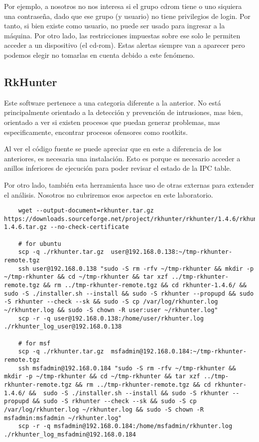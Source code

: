 \documentclass[11pt]{utalcaDoc}
\begin{document}
Por ejemplo, a nosotros no nos interesa si el grupo cdrom tiene o uno siquiera una contraseña, dado que ese grupo (y usuario) no tiene privilegios de login. Por tanto, si bien existe como usuario, no puede ser usado para ingresar a la máquina. Por otro lado, las restricciones impuestas sobre ese solo le permiten acceder a un dispositivo (el cd-rom). Estas alertas siempre van a aparecer pero podemos elegir no tomarlas en cuenta debido a este fenómeno. 


\subsection{RkHunter}

Este software pertenece a una categoria diferente a la anterior. No está principalmente orientado a la detección y prevención de intrusiones, mas bien, orientado a ver si existen procesos que puedan generar problemas, mas especificamente, encontrar procesos ofensores como rootkits.

Al ver el código fuente se puede apreciar que en este a diferencia de los anteriores, es necesaria una instalación. Esto es porque es necesario acceder a anillos inferiores de ejecución para poder revisar el estado de la IPC table.

Por otro lado, también esta herramienta hace uso de otras externas para extender el análisis. Nosotros no cubriremos esos aspectos en este laboratorio.

\begin{verbatim}
	wget --output-document=rkhunter.tar.gz https://downloads.sourceforge.net/project/rkhunter/rkhunter/1.4.6/rkhunter-1.4.6.tar.gz --no-check-certificate

	# for ubuntu
	scp -q ./rkhunter.tar.gz  user@192.168.0.138:~/tmp-rkhunter-remote.tgz 
	ssh user@192.168.0.138 "sudo -S rm -rfv ~/tmp-rkhunter && mkdir -p ~/tmp-rkhunter && cd ~/tmp-rkhunter && tar xzf ../tmp-rkhunter-remote.tgz && rm ../tmp-rkhunter-remote.tgz && cd rkhunter-1.4.6/ &&  sudo -S ./installer.sh --install && sudo -S rkhunter --propupd && sudo -S rkhunter --check --sk && sudo -S cp /var/log/rkhunter.log ~/rkhunter.log && sudo -S chown -R user:user ~/rkhunter.log"
	scp -r -q user@192.168.0.138:/home/user/rkhunter.log ./rkhunter_log_user@192.168.0.138

	# for msf
	scp -q ./rkhunter.tar.gz  msfadmin@192.168.0.184:~/tmp-rkhunter-remote.tgz 
	ssh msfadmin@192.168.0.184 "sudo -S rm -rfv ~/tmp-rkhunter && mkdir -p ~/tmp-rkhunter && cd ~/tmp-rkhunter && tar xzf ../tmp-rkhunter-remote.tgz && rm ../tmp-rkhunter-remote.tgz && cd rkhunter-1.4.6/ &&  sudo -S ./installer.sh --install && sudo -S rkhunter --propupd && sudo -S rkhunter --check --sk && sudo -S cp /var/log/rkhunter.log ~/rkhunter.log && sudo -S chown -R msfadmin:msfadmin ~/rkhunter.log"
	scp -r -q msfadmin@192.168.0.184:/home/msfadmin/rkhunter.log ./rkhunter_log_msfadmin@192.168.0.184
\end{verbatim}
\end{document}
